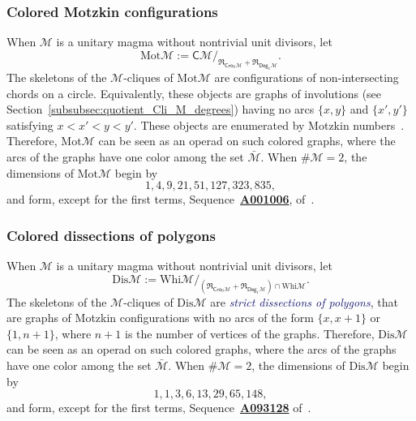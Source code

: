 \documentclass[10pt,reqno]{amsart}
\numberwithin{equation}{subsection}
\newcommand{\Mca}{\mathcal{M}}
\newcommand{\Cli}{\mathsf{C}}
\newcommand{\Deg}{\mathsf{Deg}}
\newcommand{\Cro}{\mathsf{Cro}}
\newcommand{\Whi}{\mathrm{Whi}}
\newcommand{\Motzkin}{\mathrm{Mot}}
\newcommand{\Diss}{\mathrm{Dis}}
\newcommand{\Rel}{\mathfrak{R}}
\newcommand{\Def}[1]{\textcolor{MidnightBlue}{\em #1}}
\newcommand{\OEIS}[1]{\href{http://oeis.org/#1}{{\bf #1}}}
\begin{document}
\subsubsection{Colored Motzkin configurations}%
\label{subsubsec:Motzkin_configurations}
When $\Mca$ is a unitary magma without nontrivial unit divisors, let
\begin{equation}
    \Motzkin\Mca := \Cli\Mca/_{\Rel_{\Cro_0\Mca} + \Rel_{\Deg_1\Mca}}.
\end{equation}
The skeletons of the $\Mca$-cliques of $\Motzkin\Mca$ are configurations
of non-intersecting chords on a circle. Equivalently, these objects are
graphs of involutions (see
Section~\ref{subsubsec:quotient_Cli_M_degrees}) having no arcs
$\{x, y\}$ and $\{x', y'\}$ satisfying $x < x' < y < y'$. These objects
are enumerated by Motzkin numbers~\cite{Mot48}. Therefore,
$\Motzkin\Mca$ can be seen as an operad on such colored graphs, where
the arcs of the graphs have one color among the set $\bar{\Mca}$. When
$\# \Mca = 2$, the dimensions of $\Motzkin\Mca$ begin by
\begin{equation}
    1, 4, 9, 21, 51, 127, 323, 835,
\end{equation}
and form, except for the first terms, Sequence~\OEIS{A001006},
of~\cite{Slo}.
\medskip

\subsubsection{Colored dissections of polygons}
When $\Mca$ is a unitary magma without nontrivial unit divisors, let
\begin{equation}
    \Diss\Mca := \Whi\Mca/_{(\Rel_{\Cro_0\Mca} + \Rel_{\Deg_1\Mca})
    \cap \Whi\Mca}.
\end{equation}
The skeletons of the $\Mca$-cliques of $\Diss\Mca$ are \Def{strict
dissections of polygons}, that are graphs of Motzkin configurations
with no arcs of the form $\{x, x + 1\}$ or $\{1, n + 1\}$, where $n + 1$
is the number of vertices of the graphs. Therefore, $\Diss\Mca$ can be
seen as an operad on such colored graphs, where the arcs of the graphs
have one color among the set $\bar{\Mca}$. When $\# \Mca = 2$, the
dimensions of $\Diss\Mca$ begin by
\begin{equation}
    1, 1, 3, 6, 13, 29, 65, 148,
\end{equation}
and form, except for the first terms, Sequence~\OEIS{A093128}
of~\cite{Slo}.
\medskip
\end{document}
